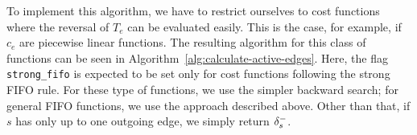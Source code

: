 To implement this algorithm, we have to restrict ourselves to cost functions where the reversal of $T_e$ can be evaluated easily.
This is the case, for example, if $c_e$ are piecewise linear functions.
The resulting algorithm for this class of functions can be seen in Algorithm~\ref{alg:calculate-active-edges}.
Here, the flag \texttt{strong\_fifo} is expected to be set only for cost functions following the strong FIFO rule.
For these type of functions, we use the simpler backward search; for  general FIFO functions, we use the approach described above.
Other than that, if $s$ has only up to one outgoing edge, we simply return $\delta^-_{s}$.
